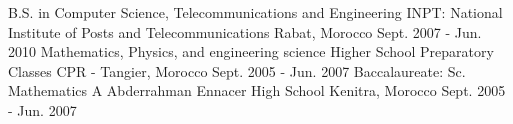 

\begin{cventries}

  \cventry
  {B.S. in Computer Science, Telecommunications and Engineering} %
  {INPT: National Institute of Posts and Telecommunications} %
  {Rabat, Morocco} %
  {Sept. 2007 - Jun. 2010} %
  {}
  \cventry
    {Mathematics, Physics, and engineering science} %
    {Higher School Preparatory Classes} %
    {CPR - Tangier, Morocco} %
    {Sept. 2005 - Jun. 2007} %
    {}
  \cventry
    {Baccalaureate: Sc. Mathematics A} %
    {Abderrahman Ennacer High School} %
    {Kenitra, Morocco} %
    {Sept. 2005 - Jun. 2007} %
    {}

\end{cventries}
